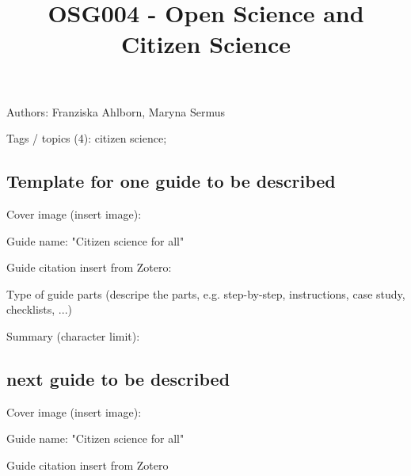 \documentclass{article}
\begin{document}
\title{OSG004 - Open Science and Citizen Science}

\maketitle


Authors: Franziska Ahlborn, Maryna Sermus


Tags / topics (4): citizen science; 


\subsection{Template for one guide to be described}\label{H7151279}






Cover image (insert image): 


Guide name: "Citizen science for all"


Guide citation insert from Zotero: \autocite{noauthor_citizen_2016}\autocite{pocock_choosing_2014}


Type of guide parts (descripe the parts, e.g. step-by-step, instructions, case study, checklists, ...)


Summary (character limit): 


\subsection{next guide to be described}\label{H7212092}



Cover image (insert image):


Guide name: "Citizen science for all"


Guide citation insert from Zotero \autocite{pocock_choosing_2014}  


\printbibliography[title={Literaturverzeichnis}]
\end{document}
